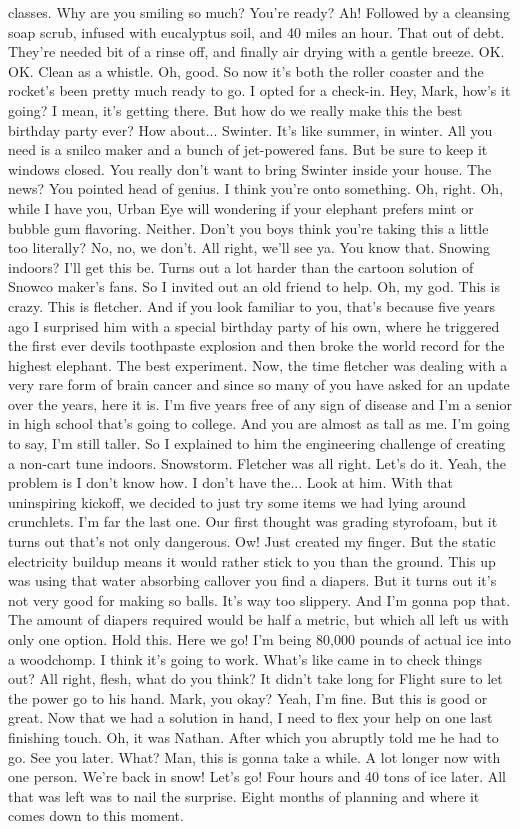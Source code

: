 \documentclass{article}
\begin{document}
classes. Why are you smiling so much? You're ready? Ah! Followed by a cleansing soap scrub, infused with eucalyptus soil, and 40 miles an hour. That out of debt. They're needed bit of a rinse off, and finally air drying with a gentle breeze. OK. OK. Clean as a whistle. Oh, good. So now it's both the roller coaster and the rocket's been pretty much ready to go. I opted for a check-in. Hey, Mark, how's it going? I mean, it's getting there. But how do we really make this the best birthday party ever? How about... Swinter. It's like summer, in winter. All you need is a snilco maker and a bunch of jet-powered fans. But be sure to keep it windows closed. You really don't want to bring Swinter inside your house. The news? You pointed head of genius. I think you're onto something. Oh, right. Oh, while I have you, Urban Eye will wondering if your elephant prefers mint or bubble gum flavoring. Neither. Don't you boys think you're taking this a little too literally? No, no, we don't. All right, we'll see ya. You know that. Snowing indoors? I'll get this be. Turns out a lot harder than the cartoon solution of Snowco maker's fans. So I invited out an old friend to help. Oh, my god. This is crazy. This is fletcher. And if you look familiar to you, that's because five years ago I surprised him with a special birthday party of his own, where he triggered the first ever devils toothpaste explosion and then broke the world record for the highest elephant. The best experiment. Now, the time fletcher was dealing with a very rare form of brain cancer and since so many of you have asked for an update over the years, here it is. I'm five years free of any sign of disease and I'm a senior in high school that's going to college. And you are almost as tall as me. I'm going to say, I'm still taller. So I explained to him the engineering challenge of creating a non-cart tune indoors. Snowstorm. Fletcher was all right. Let's do it. Yeah, the problem is I don't know how. I don't have the... Look at him. With that uninspiring kickoff, we decided to just try some items we had lying around crunchlets. I'm far the last one. Our first thought was grading styrofoam, but it turns out that's not only dangerous. Ow! Just created my finger. But the static electricity buildup means it would rather stick to you than the ground. This up was using that water absorbing callover you find a diapers. But it turns out it's not very good for making so balls. It's way too slippery. And I'm gonna pop that. The amount of diapers required would be half a metric, but which all left us with only one option. Hold this. Here we go! I'm being 80,000 pounds of actual ice into a woodchomp. I think it's going to work. What's like came in to check things out? All right, flesh, what do you think? It didn't take long for Flight sure to let the power go to his hand. Mark, you okay? Yeah, I'm fine. But this is good or great. Now that we had a solution in hand, I need to flex your help on one last finishing touch. Oh, it was Nathan. After which you abruptly told me he had to go. See you later. What? Man, this is gonna take a while. A lot longer now with one person. We're back in snow! Let's go! Four hours and 40 tons of ice later. All that was left was to nail the surprise. Eight months of planning and where it comes down to this moment. 
\end{document}
